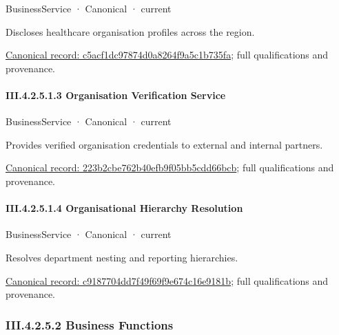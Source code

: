 \label{element:c5acf1dc97874d0a8264f9a5c1b735fa}
{\small BusinessService · Canonical · current}\par

Discloses healthcare organisation profiles across the region.


{\footnotesize \href{../../../../../../../continuum/business/business-service/c5acf1dc97874d0a8264f9a5c1b735fa.md}{Canonical record: c5acf1dc97874d0a8264f9a5c1b735fa}; full qualifications and provenance.}\par
\paragraph*{III.4.2.5.1.3 Organisation Verification Service}
\label{navigation:III.4.2.5.1.3}

\label{element:223b2cbe762b40efb9f05bb5cdd66bcb}
{\small BusinessService · Canonical · current}\par

Provides verified organisation credentials to external and internal partners.


{\footnotesize \href{../../../../../../../continuum/business/business-service/223b2cbe762b40efb9f05bb5cdd66bcb.md}{Canonical record: 223b2cbe762b40efb9f05bb5cdd66bcb}; full qualifications and provenance.}\par
\paragraph*{III.4.2.5.1.4 Organisational Hierarchy Resolution}
\label{navigation:III.4.2.5.1.4}

\label{element:c9187704dd7f49f69f9e674c16e9181b}
{\small BusinessService · Canonical · current}\par

Resolves department nesting and reporting hierarchies.


{\footnotesize \href{../../../../../../../continuum/business/business-service/c9187704dd7f49f69f9e674c16e9181b.md}{Canonical record: c9187704dd7f49f69f9e674c16e9181b}; full qualifications and provenance.}\par
\subsubsection*{III.4.2.5.2 Business Functions}
\label{navigation:III.4.2.5.2}

